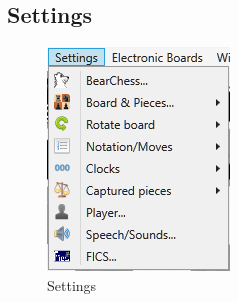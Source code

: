 \documentclass[11pt,a4paper]{article}
\begin{document}
\subsection{Settings}
\begin{figure}[H]
	\centering
	\includegraphics[scale=1.0]{Settings.png}
	\caption{Settings}
	\label{fig:Settings}
\end{figure}
\end{document}
